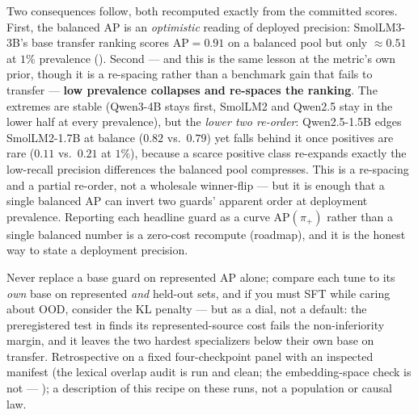 Two consequences follow, both recomputed exactly from the committed scores. First, the balanced AP is an
\emph{optimistic} reading of deployed precision: SmolLM3-3B's base transfer ranking scores $\mathrm{AP}=0.91$
on a balanced pool but only $\approx0.51$ at $1\%$ prevalence (). Second --- and this is
the same lesson at the metric's own prior, though it is a re-spacing rather than a benchmark gain that
fails to transfer --- \textbf{low prevalence collapses and re-spaces the ranking}. The extremes are stable (Qwen3-4B stays first, SmolLM2 and Qwen2.5 stay in the lower half at every
prevalence), but the \emph{lower two re-order}: Qwen2.5-1.5B edges SmolLM2-1.7B at balance ($0.82$ vs.\ $0.79$)
yet falls behind it once positives are rare ($0.11$ vs.\ $0.21$ at $1\%$), because a scarce positive class
re-expands exactly the low-recall precision differences the balanced pool compresses. This is a re-spacing and
a partial re-order, not a wholesale winner-flip --- but it is enough that a single balanced AP can invert two
guards' apparent order at deployment prevalence. Reporting each headline guard as a curve $\mathrm{AP}(\pi_+)$
rather than a single balanced number is a zero-cost recompute (roadmap), and it is the honest way to state a
deployment precision.

{Never replace a base guard on represented AP alone; compare each tune to its \emph{own} base on
represented \emph{and} held-out sets, and if you must SFT while caring about OOD, consider the KL penalty
--- but as a dial, not a default: the preregistered test in  finds its
represented-source cost fails the non-inferiority margin, and it leaves the two hardest specializers below
their own base on transfer.}
{Retrospective on a fixed four-checkpoint panel with an inspected manifest (the lexical overlap audit is
run and clean; the embedding-space check is not --- ); a
description of this recipe on these runs, not a population or causal law.}
